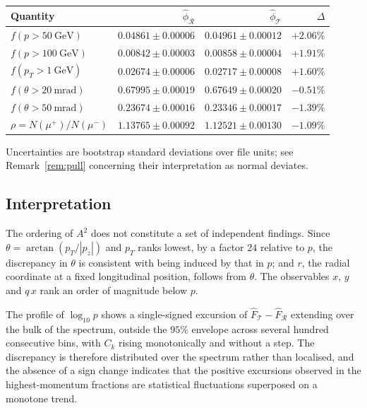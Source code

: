\documentclass[11pt,a4paper]{article}
\theoremstyle{definition}
\theoremstyle{plain}
\theoremstyle{remark}
\newcommand{\Rr}{\mathcal{R}}
\newcommand{\Tt}{\mathcal{T}}
\begin{document}
\begin{center}
\begin{tabular}{@{}lrrr@{}}
\toprule
Quantity & $\hat{\phi}_\Rr$ & $\hat{\phi}_\Tt$ & $\Delta$ \\
\midrule
$f(p>50~\mathrm{GeV})$        & $0.04861 \pm 0.00006$ & $0.04961 \pm 0.00012$ & $+2.06\%$ \\
$f(p>100~\mathrm{GeV})$       & $0.00842 \pm 0.00003$ & $0.00858 \pm 0.00004$ & $+1.91\%$ \\
$f(p_T>1~\mathrm{GeV})$       & $0.02674 \pm 0.00006$ & $0.02717 \pm 0.00008$ & $+1.60\%$ \\
$f(\theta>20~\mathrm{mrad})$  & $0.67995 \pm 0.00019$ & $0.67649 \pm 0.00020$ & $-0.51\%$ \\
$f(\theta>50~\mathrm{mrad})$  & $0.23674 \pm 0.00016$ & $0.23346 \pm 0.00017$ & $-1.39\%$ \\
$\rho = N(\mu^+)/N(\mu^-)$    & $1.13765 \pm 0.00092$ & $1.12521 \pm 0.00130$ & $-1.09\%$ \\
\bottomrule
\end{tabular}
\end{center}

Uncertainties are bootstrap standard deviations over file units; see
Remark~\ref{rem:pull} concerning their interpretation as normal deviates.

\subsection{Interpretation}

The ordering of $A^{2}$ does not constitute a set of independent findings. Since
$\theta = \arctan(p_T/|p_z|)$ and $p_T$ ranks lowest, by a factor $24$ relative
to $p$, the discrepancy in $\theta$ is consistent with being induced by that in
$p$; and $r$, the radial coordinate at a fixed longitudinal position, follows
from $\theta$. The observables $x$, $y$ and $q\,x$ rank an order of magnitude
below $p$.

The profile of $\log_{10} p$ shows a single-signed excursion of
$\hat{F}_\Tt - \hat{F}_\Rr$ extending over the bulk of the spectrum, outside the
$95\%$ envelope across several hundred consecutive bins, with $C_k$ rising
monotonically and without a step. The discrepancy is therefore distributed over
the spectrum rather than localised, and the absence of a sign change indicates
that the positive excursions observed in the highest-momentum fractions are
statistical fluctuations superposed on a monotone trend.
\end{document}
